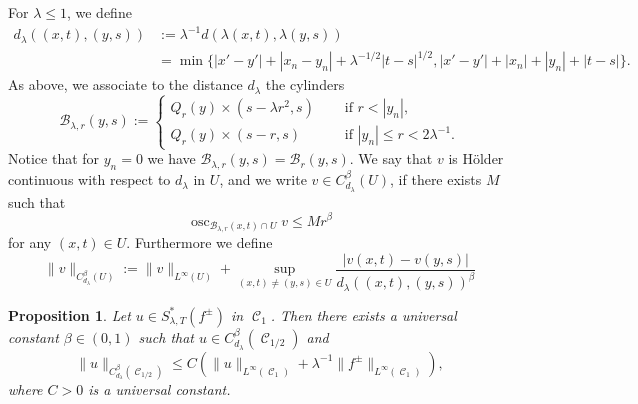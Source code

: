 \documentclass[12pt]{article}
\numberwithin{Theorem}{section}
\newtheorem{Proposition}[Theorem]{Proposition}
\theoremstyle{definition}
\theoremstyle{remark}
\numberwithin{equation}{section}
\DeclareMathOperator{\C}{\mathcal{C}}
\newcommand{\osc}{\operatorname{osc}}
\begin{document}
For $\lambda \leq 1$, we define
\begin{align*}
d_\lambda((x,t),(y,s))&:= \lambda^{-1} d(\lambda(x,t), \lambda(y,s)) \\ &=\min \{|x'-y'|+|x_n-y_n|+\lambda^{-1/2}|t-s|^{1/2}, |x'-y'|+|x_n|+|y_n|+|t-s| \}.
\end{align*}
As above, we associate to the distance $d_\lambda$ the cylinders
\begin{equation} \label{eq:def_ballBrl}
    \mathcal{B}_{\lambda,r} (y,s):= \begin{cases} Q_r(y) \times (s-\lambda r^2,s) \quad &\text{ if }r <|y_n|, \\
     Q_r(y) \times (s-r,s) \quad &\text{ if }|y_n| \leq r  < 2 \lambda^{-1} .
    \end{cases}
\end{equation}
Notice that for $y_n=0$ we have $\mathcal{B}_{\lambda,r} (y,s) = \mathcal{B}_{r} (y,s)$. 
We say that $v$ is H\"older continuous with respect to $d_\lambda$ in $U$, and we write $v \in C_{d_\lambda}^{{ \beta}}(U)$, if there exists $M$ such that 
\[
\osc_{\mathcal{B}_{\lambda,r} (x,t)\cap U } v\leq M r^{{ \beta}}
\]
for any $(x,t) \in U$. Furthermore we define
\[
\|v \|_{C_{d_\lambda}^{{ \beta}}(U)} := \| v\|_{L^{\infty}(U)} + \sup_{(x,t) \neq (y,s) \in U} \frac{|v(x,t)- v(y,s)|}{d_\lambda((x,t),(y,s))^{{ \beta}}}
\]


\begin{Proposition} \label{Prop:holder} 
Let $u\in S^*_{\lambda,T}(f^{\pm})$ in $\C_1$. Then there exists a universal constant $\beta \in (0,1)$ such that $u \in C_{d_\lambda}^{\beta}(\C_{1/2})$ and
\[
\| u\|_{C_{d_\lambda}^{\beta}(\C_{1/2})} \leq C \left( \|u\|_{L^{\infty}(\C_1)} + \lambda^{-1} \|f^\pm\|_{L^{\infty}(\C_1)} \right),
\]
where $C > 0$ is a universal constant.
\end{Proposition}
\end{document}
